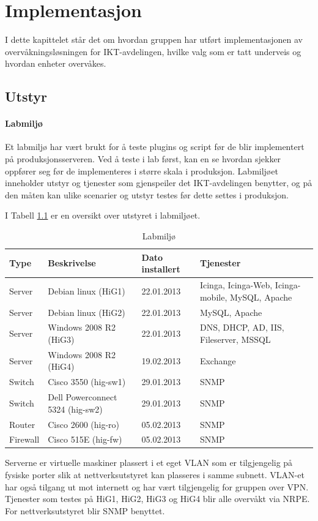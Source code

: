 \chapter{Implementasjon}
I dette kapittelet står det om hvordan gruppen har utført implementasjonen av overvåkningsløsningen for IKT-avdelingen, hvilke valg som er tatt underveis og hvordan enheter overvåkes.
\section{Utstyr}

\subsubsection{Labmiljø}
Et labmiljø har vært brukt for å teste plugins og script før de blir implementert på produksjonsserveren. Ved å teste i lab først, kan en se hvordan sjekker oppfører seg før de implementeres i større skala i produksjon. Labmiljøet inneholder utstyr og tjenester som gjenspeiler det IKT-avdelingen benytter, og på den måten kan ulike scenarier og utstyr testes før dette settes i produksjon.

I Tabell \ref{labmiljo} er en oversikt over utstyret i labmiljøet.
\begin{changemargin}{-1cm}{-1cm}
\begin{table}
\begin{center}
\begin{tabular}{ | l | l | l | p{4cm} |} \hline
	\textbf{Type} & \textbf{Beskrivelse} & \textbf{Dato installert} & \textbf{Tjenester} \\ \hline
	Server & Debian linux (HiG1) & 22.01.2013 & Icinga, Icinga-Web, Icinga-mobile, MySQL, Apache \\ \hline
	Server & Debian linux (HiG2) & 22.01.2013 &	MySQL, Apache \\ \hline
	Server & Windows 2008 R2 (HiG3) & 22.01.2013 & DNS, DHCP, AD, IIS, Fileserver, MSSQL \\ \hline
	Server & Windows 2008 R2 (HiG4) & 19.02.2013 & Exchange \\ \hline 
	Switch & Cisco 3550 (hig-sw1) &	29.01.2013 & SNMP \\ \hline
	Switch & Dell Powerconnect 5324 (hig-sw2) & 29.01.2013 & SNMP \\ \hline
	Router & Cisco 2600 (hig-ro) & 05.02.2013 & SNMP \\ \hline 
	Firewall & Cisco 515E (hig-fw) & 05.02.2013 & SNMP \\ \hline
\end{tabular}
\caption{Labmiljø}
\label{labmiljo}
\end{center}
\end{table}
\end{changemargin}
Serverne er virtuelle maskiner plassert i et eget VLAN som er tilgjengelig på fysiske porter slik at nettverksutstyret kan plasseres i samme subnett. VLAN-et har også tilgang ut mot internett og har vært tilgjengelig for gruppen over VPN. Tjenester som testes på HiG1, HiG2, HiG3 og HiG4 blir alle overvåkt via NRPE. For nettverksutstyret blir SNMP benyttet.

